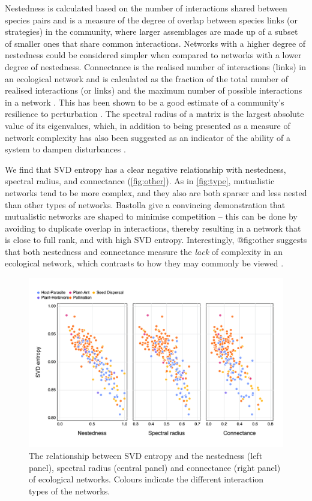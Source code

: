 Nestedness is calculated based on the number of interactions shared between
species pairs and is a measure of the degree of overlap between species links
(or strategies) in the community, where larger assemblages are made up of a
subset of smaller ones that share common interactions. Networks with a higher
degree of nestedness could be considered simpler when compared to networks with
a lower degree of nestedness. Connectance is the realised number of interactions
(links) in an ecological network and is calculated as the fraction of the total
number of realised interactions (or links) and the maximum number of possible
interactions in a network \cite{Martinez1992ConCon}. This has been shown to be a
good estimate of a community's resilience to perturbation
\cite{Dunne2002NetStr}. The spectral radius of a matrix is the largest absolute
value of its eigenvalues, which, in addition to being presented as a measure of
network complexity has also been suggested as an indicator of the ability of a
system to dampen disturbances \cite{Phillips2011StrEco}.

We find that SVD entropy has a clear negative relationship with nestedness,
spectral radius, and connectance (\autoref{fig:other}). As in
\autoref{fig:type}, mutualistic networks tend to be more complex, and they also
are both sparser and less nested than other types of networks.
Bastolla\cite{Bastolla2009ArcMut} give a convincing demonstration that
mutualistic networks are shaped to minimise competition -- this can be done by
avoiding to duplicate overlap in interactions, thereby resulting in a network
that is close to full rank, and with high SVD entropy. Interestingly, @fig:other
suggests that both nestedness and connectance measure the \emph{lack} of
complexity in an ecological network, which contrasts to how they may commonly be
viewed \cite{Landi2018ComSta}.

\begin{figure}[h]
    \centering
    \includegraphics[width=\textwidth]{figures/others_v_entropy.png}
    \caption{The relationship between SVD entropy and the nestedness (left
panel), spectral radius (central panel) and connectance (right panel) of
ecological networks. Colours indicate the different interaction types of the
networks.}
    \label{fig:other}
\end{figure}

